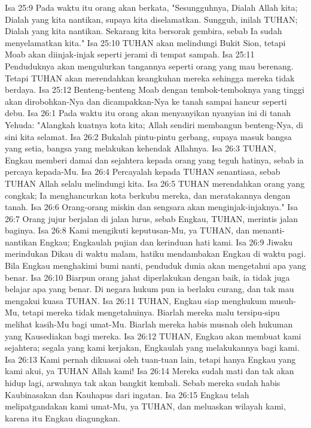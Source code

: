 Isa 25:9  Pada waktu itu orang akan berkata, "Sesungguhnya, Dialah Allah kita; Dialah yang kita nantikan, supaya kita diselamatkan. Sungguh, inilah TUHAN; Dialah yang kita nantikan. Sekarang kita bersorak gembira, sebab Ia sudah menyelamatkan kita."
Isa 25:10  TUHAN akan melindungi Bukit Sion, tetapi Moab akan diinjak-injak seperti jerami di tempat sampah.
Isa 25:11  Penduduknya akan mengulurkan tangannya seperti orang yang mau berenang. Tetapi TUHAN akan merendahkan keangkuhan mereka sehingga mereka tidak berdaya.
Isa 25:12  Benteng-benteng Moab dengan tembok-temboknya yang tinggi akan dirobohkan-Nya dan dicampakkan-Nya ke tanah sampai hancur seperti debu.
Isa 26:1  Pada waktu itu orang akan menyanyikan nyanyian ini di tanah Yehuda: "Alangkah kuatnya kota kita; Allah sendiri membangun benteng-Nya, di sini kita selamat.
Isa 26:2  Bukalah pintu-pintu gerbang, supaya masuk bangsa yang setia, bangsa yang melakukan kehendak Allahnya.
Isa 26:3  TUHAN, Engkau memberi damai dan sejahtera kepada orang yang teguh hatinya, sebab ia percaya kepada-Mu.
Isa 26:4  Percayalah kepada TUHAN senantiasa, sebab TUHAN Allah selalu melindungi kita.
Isa 26:5  TUHAN merendahkan orang yang congkak; Ia menghancurkan kota berkubu mereka, dan meratakannya dengan tanah.
Isa 26:6  Orang-orang miskin dan sengsara akan menginjak-injaknya."
Isa 26:7  Orang jujur berjalan di jalan lurus, sebab Engkau, TUHAN, merintis jalan baginya.
Isa 26:8  Kami mengikuti keputusan-Mu, ya TUHAN, dan menanti-nantikan Engkau; Engkaulah pujian dan kerinduan hati kami.
Isa 26:9  Jiwaku merindukan Dikau di waktu malam, hatiku mendambakan Engkau di waktu pagi. Bila Engkau menghakimi bumi nanti, penduduk dunia akan mengetahui apa yang benar.
Isa 26:10  Biarpun orang jahat diperlakukan dengan baik, ia tidak juga belajar apa yang benar. Di negara hukum pun ia berlaku curang, dan tak mau mengakui kuasa TUHAN.
Isa 26:11  TUHAN, Engkau siap menghukum musuh-Mu, tetapi mereka tidak mengetahuinya. Biarlah mereka malu tersipu-sipu melihat kasih-Mu bagi umat-Mu. Biarlah mereka habis musnah oleh hukuman yang Kausediakan bagi mereka.
Isa 26:12  TUHAN, Engkau akan membuat kami sejahtera; segala yang kami kerjakan, Engkaulah yang melakukannya bagi kami.
Isa 26:13  Kami pernah dikuasai oleh tuan-tuan lain, tetapi hanya Engkau yang kami akui, ya TUHAN Allah kami!
Isa 26:14  Mereka sudah mati dan tak akan hidup lagi, arwahnya tak akan bangkit kembali. Sebab mereka sudah habis Kaubinasakan dan Kauhapus dari ingatan.
Isa 26:15  Engkau telah melipatgandakan kami umat-Mu, ya TUHAN, dan meluaskan wilayah kami, karena itu Engkau diagungkan.
